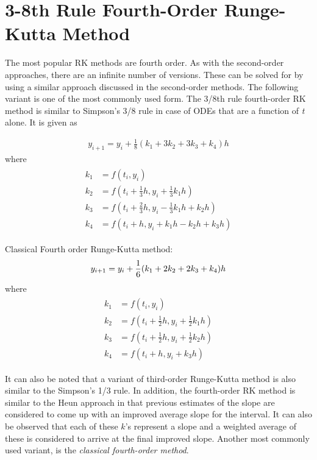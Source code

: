 \documentclass[book.tex]{subfiles}
\begin{document}
\section{3-8th Rule Fourth-Order Runge-Kutta Method}

The most popular RK methods are fourth order. As with the second-order approaches, there
are an infinite number of versions. These can be solved for by using a similar approach discussed in the second-order methods. The following variant is one of the most commonly used form. The 3/8th rule fourth-order RK method is similar to Simpson’s 3/8 rule in case of  ODEs that are a function of \textit{t} alone. It is given as

\begin{align}
y_{i+1} = y_{i} + \frac{1}{8}(k_1 + 3k_2 + 3k_3 + k_4)h
\end{align}
where
\begin{align}
\begin{split}
k_1 &= f(t_i,y_i) \\
k_2 &= f(t_i + \frac{1}{3}h,y_i + \frac{1}{3}k_1h)\\
k_3 &= f(t_i + \frac{2}{3}h,y_i - \frac{1}{3}k_1h + k_2h)\\	
k_4 &= f(t_i + h,y_i + k_1h - k_2h + k_3h)
\end{split}
\end{align}

\begin{marginfigure}
	Classical Fourth order Runge-Kutta method:
	\vspace{-10pt}
	\begin{equation*}
	y_{i+1} = y_{i} + \frac{1}{6}(k_1 + 2k_2 + 2k_3 + k_4)h
	\vspace{-6pt}
	\end{equation*}
	where
	\begin{eqnarray*}
		\begin{split}
			k_1 &= f(t_i,y_i) \\
			k_2 &= f(t_i + \frac{1}{2}h,y_i + \frac{1}{2}k_1h)\\
			k_3 &= f(t_i + \frac{1}{2}h,y_i + \frac{1}{2}k_2h)\\	
			k_4 &= f(t_i + h,y_i + k_3h)
		\end{split}
	\end{eqnarray*}
\end{marginfigure}	
It can also be noted that a variant of third-order Runge-Kutta method is also similar to the Simpson's 1/3 rule. In addition, the fourth-order RK method is similar to the Heun approach in that previous estimates of the slope are considered to come up with an improved average slope for the interval. It can also be observed that each of these $k$'s represent a slope and a weighted average of these is considered to arrive at the final improved slope. Another most commonly used variant, is the \textit{classical fourth-order method}. 
\end{document}
